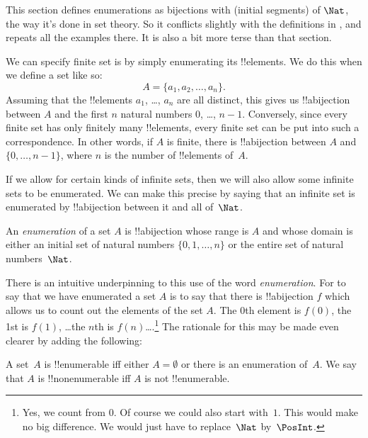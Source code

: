 

\begin{editorial}
  This section defines enumerations as bijections with (initial
  segments) of $\Nat$, the way it's done in set theory. So it
  conflicts slightly with the definitions in , and
  repeats all the examples there. It is also a bit more terse than
  that section.
\end{editorial}

We can specify finite set is by simply enumerating its
!!{element}s. We do this when we define a set like so:
\[
  A = \{a_1, a_2, \ldots, a_n\}.
\]
Assuming that the !!{element}s $a_1$, \dots, $a_n$ are all distinct,
this gives us !!a{bijection} between $A$ and the first $n$ natural
numbers $0$, \dots, $n-1$. Conversely, since every finite set has only
finitely many !!{element}s, every finite set can be put into such a
correspondence. In other words, if $A$ is finite, there is
!!a{bijection} between $A$ and $\{0, \dots, n-1\}$, where $n$ is the
number of !!{element}s of~$A$.

If we allow for certain kinds of infinite sets, then we will also
allow some infinite sets to be enumerated. We can make this precise by
saying that an infinite set is enumerated by !!a{bijection} between it
and all of~$\Nat$.

\begin{defn} 
An \emph{enumeration} of a set $A$ is !!a{bijection} whose range is
$A$ and whose domain is either an initial set of natural numbers $\{0,
1, \ldots, n\}$ {or} the entire set of natural numbers~$\Nat$. 
\end{defn}

\begin{explain}
There is an intuitive underpinning to this use of the word
\emph{enumeration}. For to say that we have enumerated a set $A$ is to
say that there is !!a{bijection} $f$ which allows us to count out the
elements of the set $A$. The $0$th element is $f(0)$, the 1st is
$f(1)$, \ldots the $n$th is $f(n)$\ldots.\footnote{Yes, we count
from $0$. Of course we could also start with~$1$. This would
make no big difference. We would just have to replace~$\Nat$
by~$\PosInt$.} The rationale for this may be made even clearer by
adding the following:
\end{explain}

\begin{defn}
  A set~$A$ is !!{enumerable} iff either $A = \emptyset$ or there is
  an enumeration of~$A$. We say that $A$ is !!{nonenumerable} iff $A$
  is not !!{enumerable}.
\end{defn}


